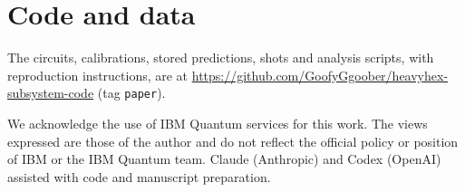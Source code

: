 \documentclass[aps,pra,reprint,nofootinbib,longbibliography,floatfix]{revtex4-2}
\newcommand{\repourl}{\begingroup\def\UrlBreaks{\do\/\do\-}\url{https://github.com/GoofyGgoober/heavyhex-subsystem-code}\endgroup}
\begin{document}
\section*{Code and data}

The circuits, calibrations, stored predictions, shots and analysis scripts, with reproduction instructions, are at \repourl{} (tag \texttt{paper}).

\begin{acknowledgments}
We acknowledge the use of IBM Quantum services for this work.
The views expressed are those of the author and do not reflect the official policy or position of IBM or the IBM Quantum team.
Claude (Anthropic) and Codex (OpenAI) assisted with code and manuscript preparation.
\end{acknowledgments}


\end{document}
